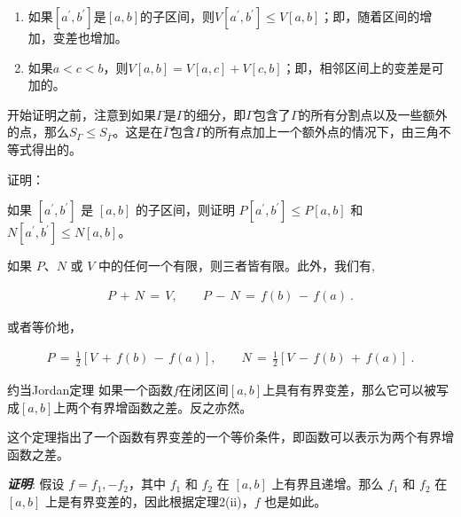 \begin{theorem}{}
\begin{enumerate}
\item 如果$[a^{\prime},b^{\prime}]$是$[a,b]$的子区间，则$V[a^{\prime},b^{\prime}]\leq V[a,b]$；即，随着区间的增加，变差也增加。
\item 如果$a<c<b$，则$V[a,b]=V[a,c]+V[c,b]$；即，相邻区间上的变差是可加的。
\end{enumerate}
\end{theorem}
开始证明之前，注意到如果$\Gamma$是$\Gamma$的细分，即$\Gamma$包含了$\Gamma$的所有分割点以及一些额外的点，那么$S_{\Gamma}\leq S_{\bar{\Gamma}}$。这是在$\bar{\Gamma}$包含$\Gamma$的所有点加上一个额外点的情况下，由三角不等式得出的。

\begin{example}{证明：}

\end{example}

\begin{example}{如果 $[a^{\prime},b^{\prime}]$ 是 $[a,b]$ 的子区间，则证明 $P[a^{\prime},b^{\prime}]\leq P[a,b]$ 和 $N[a^{\prime},b^{\prime}]\leq N[a,b]$。}

\end{example}

\begin{theorem}{}
如果 $P$、$N$ 或 $V$ 中的任何一个有限，则三者皆有限。此外，我们有,

\begin{align}
 P\,+\,N\,=\,V,\qquad P\,-\,N\,=\,f(b)\,-\,f(a)~.
\end{align}

或者等价地，

\begin{align}
 P\,=\,\frac{1}{2}[V\,+\,f(b)\,-\,f(a)],\qquad N\,=\,\frac{1}{2}[V\,-\,f(b)\,+\,f(a)]~.
\end{align}
\end{theorem}

\begin{corollary}{约当Jordan定理}
如果一个函数$f$在闭区间$[a,b]$上具有有界变差，那么它可以被写成$[a,b]$上两个有界增函数之差。反之亦然。
\end{corollary}

这个定理指出了一个函数有界变差的一个等价条件，即函数可以表示为两个有界增函数之差。

\textbf{\textsl{证明}}: 假设 $f=f_{1},-f_{2}$，其中 $f_{1}$ 和 $f_{2}$ 在 $[a,b]$ 上有界且递增。那么 $f_{1}$ 和 $f_{2}$ 在 $[a,b]$ 上是有界变差的，因此根据定理2(ii)，$f$ 也是如此。

